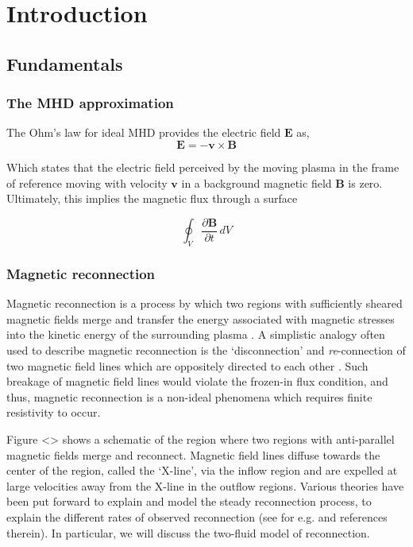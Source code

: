 \chapter{Introduction}

\section{Fundamentals}

\subsection{The MHD approximation}

The Ohm's law for ideal MHD provides the electric field $\mathbf{E}$ as,
\begin{equation}
    \mathbf{E} = -\mathbf{v} \times \mathbf{B}
\end{equation}

Which states that the electric field perceived by the moving plasma in the frame of reference moving with velocity $\mathbf{v}$ in a background magnetic field $\mathbf{B}$ is zero. Ultimately, this implies the magnetic flux through a surface 

\begin{equation}
    \oint_V \frac{\partial \mathbf{B}}{\partial t} \,dV
\end{equation}

\subsection{Magnetic reconnection}
Magnetic reconnection is a process by which two regions with sufficiently sheared magnetic fields merge and transfer the energy associated with magnetic stresses into the kinetic energy of the surrounding plasma \cite{Priest2000MagneticReconnection,Yamada2010MagneticReconnection}. A simplistic analogy often used to describe magnetic reconnection is the `disconnection' and \emph{re}-connection of two magnetic field lines which are oppositely directed to each other \cite{Gonzalez2016FundamentalReconnection}. Such breakage of magnetic field lines would violate the frozen-in flux condition, and thus, magnetic reconnection is a non-ideal phenomena which requires finite resistivity to occur. 

Figure <> shows a schematic of the region where two regions with anti-parallel magnetic fields merge and reconnect. Magnetic field lines diffuse towards the center of the region, called the `X-line', via the inflow region and are expelled at large velocities away from the X-line in the outflow regions. Various theories have been put forward to explain and model the steady reconnection process, to explain the different rates of observed reconnection (see for e.g.  and references therein). In particular, we will discuss the two-fluid model of reconnection. 

